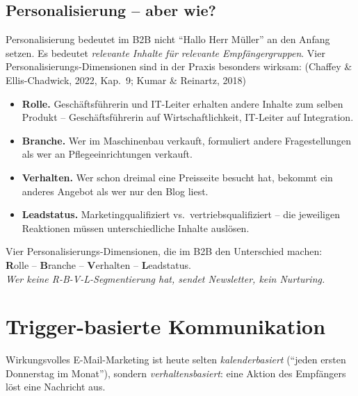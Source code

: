 \documentclass[11pt,a4paper,oneside]{article}
\newcommand{\caveatfontfallback}{\itshape}
\newcommand\caveatfont{\caveatfontfallback}%
\newcommand{\akzent}[1]{{\caveatfont\color{lpAmber}#1}}
\newcommand{\quelle}[1]{{\footnotesize\color{lpGray}(#1)}}
\begin{document}
\subsection{Personalisierung -- aber wie?}

Personalisierung bedeutet im B2B nicht ``Hallo Herr Müller'' an den Anfang setzen. Es bedeutet \emph{relevante Inhalte für relevante Empfängergruppen}. Vier Personalisierungs-Dimensionen sind in der Praxis besonders wirksam: \quelle{Chaffey \& Ellis-Chadwick, 2022, Kap.~9; Kumar \& Reinartz, 2018}

\begin{itemize}
  \item \textbf{Rolle.} Geschäftsführerin und IT-Leiter erhalten andere Inhalte zum selben Produkt -- Geschäftsführerin auf Wirtschaftlichkeit, IT-Leiter auf Integration.
  \item \textbf{Branche.} Wer im Maschinenbau verkauft, formuliert andere Fragestellungen als wer an Pflegeeinrichtungen verkauft.
  \item \textbf{Verhalten.} Wer schon dreimal eine Preisseite besucht hat, bekommt ein anderes Angebot als wer nur den Blog liest.
  \item \textbf{Leadstatus.} Marketingqualifiziert vs.\ vertriebsqualifiziert -- die jeweiligen Reaktionen müssen unterschiedliche Inhalte auslösen.
\end{itemize}

\begin{eselsbox}[Eselsbrücke: \akzent{R-B-V-L}]
Vier Personalisierungs-Dimensionen, die im B2B den Unterschied machen:\\[2pt]
\textbf{R}olle -- \textbf{B}ranche -- \textbf{V}erhalten -- \textbf{L}eadstatus.\\[2pt]
\emph{Wer keine R-B-V-L-Segmentierung hat, sendet \emph{Newsletter}, kein Nurturing.}
\end{eselsbox}

\section{Trigger-basierte Kommunikation}

Wirkungsvolles E-Mail-Marketing ist heute selten \emph{kalenderbasiert} (``jeden ersten Donnerstag im Monat''), sondern \emph{verhaltensbasiert}: eine Aktion des Empfängers löst eine Nachricht aus.
\end{document}
